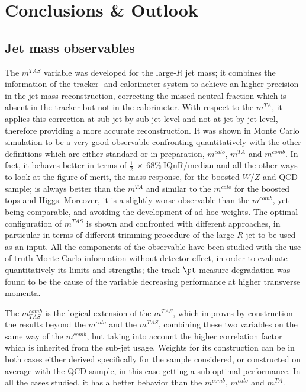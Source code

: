 \documentclass[UKenglish,texlive=2013]{\ATLASLATEXPATH atlasdoc}
\newcommand{\mta}{m^{TA}}
\newcommand{\mtas}{m^{TAS}}
\newcommand{\mcal}{m^{calo}}
\newcommand{\mcomb}{m^{comb}}
\newcommand{\mcombtas}{m^{comb}_{TAS}}
\newcommand{\iqr}{\frac{1}{2}\: \times\: 68\% \:\textrm{IQnR/median}}
\begin{document}
\section{Conclusions \& Outlook}
\label{sec:conclusions}
\subsection{Jet mass observables}
The $\mtas$ variable was developed for the large-$R$ jet mass; it combines the information of the tracker- and calorimeter-system to achieve an higher precision in the jet mass reconstruction, correcting the missed neutral fraction which is absent in the tracker but not in the calorimeter.
With respect to the $\mta$, it applies this correction at sub-jet by sub-jet level and not at jet by jet level, therefore providing a more accurate reconstruction. 
It was shown in Monte Carlo simulation to be a very good observable confronting quantitatively with the other definitions which are either standard or in preparation, $\mcal$, $\mta$ and $\mcomb$.
In fact, it behaves better in terms of $\iqr$ and all the other ways to look at the figure of merit, the mass response, for the boosted $W/Z$ and QCD sample; is always better than the $\mta$ and similar to the $\mcal$ for the boosted tops and Higgs.
Moreover, it is a slightly worse observable than the $\mcomb$, yet being comparable, and avoiding the development of ad-hoc weights.
The optimal configuration of $\mtas$ is shown and confronted with different approaches, in particular in terms of different trimming procedure of the large-$R$ jet to be used as an input.
All the components of the observable have been studied with the use of truth Monte Carlo information without detector effect, in order to evaluate quantitatively its limits and strengths; the track $\pt$ measure degradation was found to be the cause of the variable decreasing performance at higher transverse momenta.

The $\mcombtas$ is the logical extension of the $\mtas$, which improves by construction the results beyond the $\mcal$ and the $\mtas$, combining these two variables on the same way of the $\mcomb$, but taking into account the higher correlation factor which is inherited from the sub-jet usage.
Weights for its construction can be in both cases either derived specifically for the sample considered, or constructed on average with the QCD sample, in this case getting a sub-optimal performance. 
In all the cases studied, it has a better behavior than the $\mcomb$, $\mcal$ and $\mta$.
\end{document}
